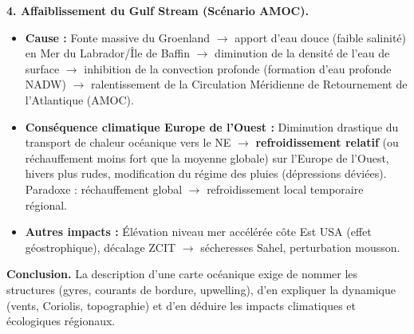 \documentclass[11pt]{article}
\newcommand{\cle}[1]{{\popxbold\color{popdark}#1}}
\begin{document}
\begin{exoresolu}
\textbf{4. Affaiblissement du Gulf Stream (Scénario AMOC).}
\begin{itemize}
    \item \textbf{Cause :} Fonte massive du Groenland $\to$ apport d'eau douce (faible salinité) en Mer du Labrador/Île de Baffin $\to$ diminution de la densité de l'eau de surface $\to$ inhibition de la convection profonde (formation d'eau profonde NADW) $\to$ ralentissement de la \cle{Circulation Méridienne de Retournement de l'Atlantique (AMOC)}.
    \item \textbf{Conséquence climatique Europe de l'Ouest :} Diminution drastique du transport de chaleur océanique vers le NE $\to$ \textbf{refroidissement relatif} (ou réchauffement moins fort que la moyenne globale) sur l'Europe de l'Ouest, hivers plus rudes, modification du régime des pluies (dépressions déviées). Paradoxe : réchauffement global $\to$ refroidissement local temporaire régional.
    \item \textbf{Autres impacts :} Élévation niveau mer accélérée côte Est USA (effet géostrophique), décalage ZCIT $\to$ sécheresses Sahel, perturbation mousson.
\end{itemize}

\textbf{Conclusion.} La description d'une carte océanique exige de nommer les structures (gyres, courants de bordure, upwelling), d'en expliquer la dynamique (vents, Coriolis, topographie) et d'en déduire les impacts climatiques et écologiques régionaux.
\end{exoresolu}

\end{document}
